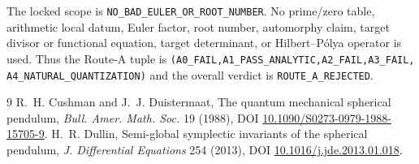 \documentclass[10pt]{article}
\begin{document}
The locked scope is \texttt{NO\_BAD\_EULER\_OR\_ROOT\_NUMBER}.  No prime/zero
table, arithmetic local datum, Euler factor, root number, automorphy claim,
target divisor or functional equation, target determinant, or
Hilbert--Pólya operator is used.  Thus the Route-A tuple is
\texttt{(A0\_FAIL,A1\_PASS\_ANALYTIC,A2\_FAIL,A3\_FAIL,
A4\_NATURAL\_QUANTIZATION)} and the overall verdict is
\texttt{ROUTE\_A\_REJECTED}.
\fi

\begin{thebibliography}{9}
 R.~H. Cushman and J.~J. Duistermaat,
The quantum mechanical spherical pendulum, \emph{Bull. Amer. Math. Soc.}
19 (1988), DOI \href{https://doi.org/10.1090/S0273-0979-1988-15705-9}
{10.1090/S0273-0979-1988-15705-9}.
 H.~R. Dullin, Semi-global symplectic invariants of the spherical
pendulum, \emph{J. Differential Equations} 254 (2013), DOI
\href{https://doi.org/10.1016/j.jde.2013.01.018}
{10.1016/j.jde.2013.01.018}.
\end{thebibliography}
\end{document}
